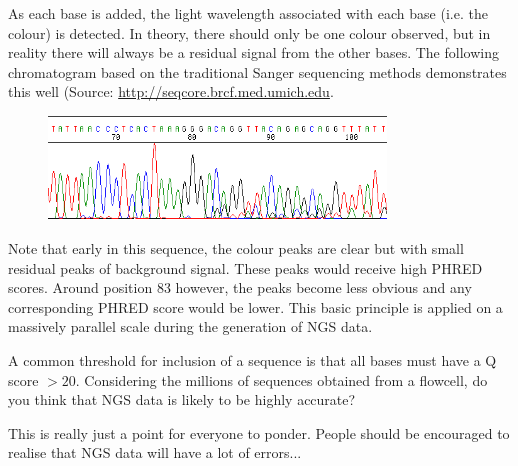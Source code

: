 \begin{note}
As each base is added, the light wavelength associated with each base (i.e. the colour) is detected.
In theory, there should only be one colour observed, but in reality there will always be a residual signal from the other bases.
The following chromatogram based on the traditional Sanger sequencing methods demonstrates this well (Source: \url{http://seqcore.brcf.med.umich.edu}.\\
\end{note}

\begin{figure}[h!]
  \centering
    \includegraphics[width=0.8\textwidth]{clonesite.png}
\end{figure}

Note that early in this sequence, the colour peaks are clear but with small residual peaks of background signal.
These peaks would receive high PHRED scores.
Around position 83 however, the peaks become less obvious and any corresponding PHRED score would be lower.
This basic principle is applied on a massively parallel scale during the generation of NGS data.\\

\begin{questions}
A common threshold for inclusion of a sequence is that all bases must have a Q score $>20$.
Considering the millions of sequences obtained from a flowcell, do you think that NGS data is likely to be highly accurate?\\
\begin{answer}
This is really just a point for everyone to ponder.
People should be encouraged to realise that NGS data will have a lot of errors...
\end{answer}
\end{questions}

\clearpage
